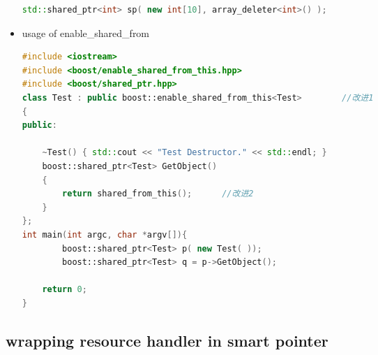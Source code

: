 \documentclass[a4paper,12pt,twoside]{book}
\begin{document}
\begin{itemize}
\begin{lstlisting}[frame=single, language=c++]
std::shared_ptr<int> sp( new int[10], array_deleter<int>() );
\end{lstlisting}

\item usage of enable\_shared\_from
\begin{lstlisting}[frame=single, language=c++]
#include <iostream>
#include <boost/enable_shared_from_this.hpp>
#include <boost/shared_ptr.hpp>
class Test : public boost::enable_shared_from_this<Test>        //改进1
{
public:
    
    ~Test() { std::cout << "Test Destructor." << std::endl; }
    boost::shared_ptr<Test> GetObject()
    {
        return shared_from_this();      //改进2
    }
};
int main(int argc, char *argv[]){
        boost::shared_ptr<Test> p( new Test( ));
        boost::shared_ptr<Test> q = p->GetObject();
    
    return 0;
}
\end{lstlisting}


\end{itemize}

\subsection{wrapping resource handler in smart pointer}
\end{document}
